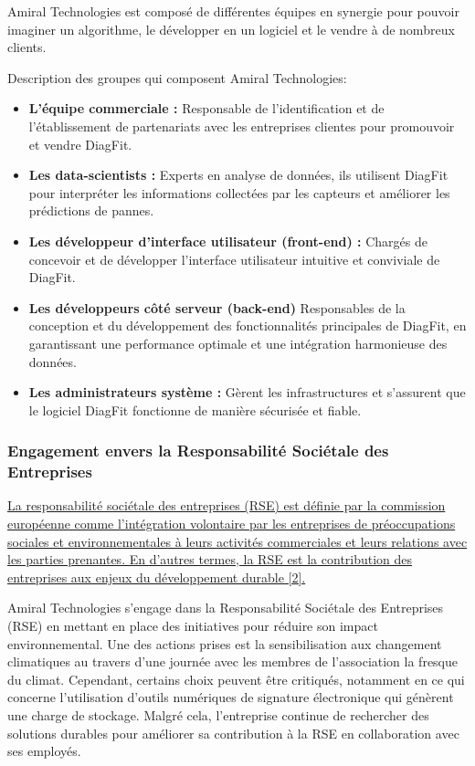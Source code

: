 Amiral Technologies est composé de différentes équipes en synergie pour pouvoir imaginer un algorithme, le développer en un logiciel et le vendre à de nombreux clients.

Description des groupes qui composent Amiral Technologies:
\begin{itemize}
    \item \textbf{L'équipe commerciale :} Responsable de l'identification et de l'établissement de partenariats avec les entreprises clientes pour promouvoir et vendre DiagFit.
    \item \textbf{Les data-scientists :} Experts en analyse de données, ils utilisent DiagFit pour interpréter les informations collectées par les capteurs et améliorer les prédictions de pannes.
    \item \textbf{Les développeur d'interface utilisateur (front-end) :} Chargés de concevoir et de développer l'interface utilisateur intuitive et conviviale de DiagFit.
    \item \textbf{Les développeurs côté serveur (back-end)} Responsables de la conception et du développement des fonctionnalités principales de DiagFit, en garantissant une performance optimale et une intégration harmonieuse des données.
    \item \textbf{Les administrateurs système :} Gèrent les infrastructures et s'assurent que le logiciel DiagFit fonctionne de manière sécurisée et fiable.
\end{itemize}

\subsubsection{Engagement envers la Responsabilité Sociétale des Entreprises}
\hyperref[rse]{La responsabilité sociétale des entreprises (RSE) est définie par la commission européenne comme l'intégration volontaire par les entreprises de préoccupations sociales et environnementales à leurs activités commerciales et leurs relations avec les parties prenantes.
En d'autres termes, la RSE est la contribution des entreprises aux enjeux du développement durable [2].}

Amiral Technologies s'engage dans la Responsabilité Sociétale des Entreprises (RSE) en mettant en place des initiatives pour réduire son impact environnemental.
Une des actions prises est la sensibilisation aux changement climatiques au travers d'une journée avec les membres de l'association la fresque du climat.
Cependant, certains choix peuvent être critiqués, notamment en ce qui concerne l'utilisation d'outils numériques de signature électronique qui génèrent une charge de stockage.
Malgré cela, l'entreprise continue de rechercher des solutions durables pour améliorer sa contribution à la RSE en collaboration avec ses employés.

